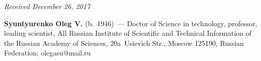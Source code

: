 \vspace*{-6pt}

\hfill{\small\textit{Received December 26, 2017}}

    
    \Contrl
    
      \noindent
      \textbf{Syuntyurenko Oleg V.} (b.\ 1946)~--- Doctor of Science in 
technology, professor, leading scientist, All Russian Institute of Scientific 
and Technical Information of the Russian Academy of Sciences, 20a~Usievich Str., 
Moscow 125190, Russian Federation; \mbox{olegasu@mail.ru}
   \label{end\stat}


\renewcommand{\bibname}{\protect\rm Литература} 
     